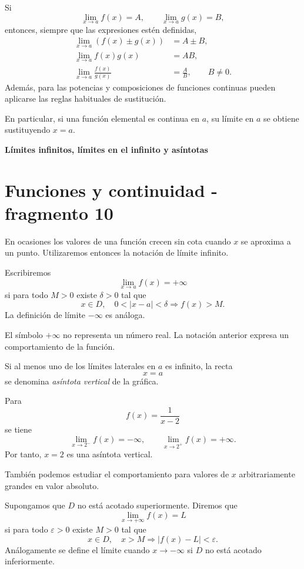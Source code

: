 \begin{proposition}
Si
\[
\lim_{x\to a}f(x)=A,
\qquad
\lim_{x\to a}g(x)=B,
\]
entonces, siempre que las expresiones estén definidas,
\begin{align*}
\lim_{x\to a}(f(x)\pm g(x))&=A\pm B,\\
\lim_{x\to a}f(x)g(x)&=AB,\\
\lim_{x\to a}\frac{f(x)}{g(x)}&=\frac AB,\qquad B\neq0.
\end{align*}
Además, para las potencias y composiciones de funciones continuas pueden aplicarse las reglas habituales de sustitución.
\end{proposition}

En particular, si una función elemental es continua en $a$, su límite en $a$ se obtiene sustituyendo $x=a$.

\textbf{Límites infinitos, límites en el infinito y asíntotas}


\section{Funciones y continuidad - fragmento 10}
En ocasiones los valores de una función crecen sin cota cuando $x$ se aproxima a un punto. Utilizaremos entonces la notación de límite infinito.

\begin{definition}
Escribiremos
\[
\lim_{x\to a}f(x)=+\infty
\]
si para todo $M>0$ existe $\delta>0$ tal que
\[
x\in D,\quad 0<|x-a|<\delta\Longrightarrow f(x)>M.
\]
La definición de límite $-\infty$ es análoga.
\end{definition}

El símbolo $+\infty$ no representa un número real. La notación anterior expresa un comportamiento de la función.

Si al menos uno de los límites laterales en $a$ es infinito, la recta
\[
x=a
\]
se denomina \emph{asíntota vertical} de la gráfica.

\begin{example}
Para
\[
f(x)=\frac{1}{x-2}
\]
se tiene
\[
\lim_{x\to2^-}f(x)=-\infty,
\qquad
\lim_{x\to2^+}f(x)=+\infty.
\]
Por tanto, $x=2$ es una asíntota vertical.
\end{example}

También podemos estudiar el comportamiento para valores de $x$ arbitrariamente grandes en valor absoluto.

\begin{definition}
Supongamos que $D$ no está acotado superiormente. Diremos que
\[
\lim_{x\to+\infty}f(x)=L
\]
si para todo $\varepsilon>0$ existe $M>0$ tal que
\[
x\in D,\quad x>M\Longrightarrow |f(x)-L|<\varepsilon.
\]
Análogamente se define el límite cuando $x\to-\infty$ si $D$ no está acotado inferiormente.
\end{definition}


